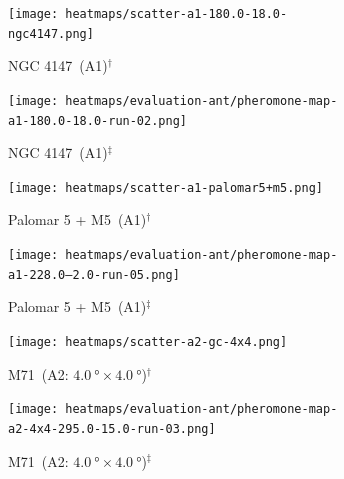 \begin{figure}[H]
    \centering
    \begin{subfigure}[b]{0.241\textwidth}
        \centering
        \captionsetup{justification=centering,format=hang}
        \texttt{[image: heatmaps/scatter-a1-180.0-18.0-ngc4147.png]}
        \caption{\label{fig:scatter-ngc4147} NGC 4147~(A1)$^{\dagger}$ \phantom{abc def ghi}}
    \end{subfigure}
    \begin{subfigure}[b]{0.241\textwidth}
        \centering
        \captionsetup{justification=centering,format=hang}
        \texttt{[image: heatmaps/evaluation-ant/pheromone-map-a1-180.0-18.0-run-02.png]}
        \caption{\label{fig:heat-ngc4147} NGC 4147~(A1)$^{\ddagger}$ \phantom{abc def ghi}}
    \end{subfigure}
    \hspace{0.3em}
    \begin{subfigure}[b]{0.241\textwidth}
        \centering
        \captionsetup{justification=centering,format=hang}
        \texttt{[image: heatmaps/scatter-a1-palomar5+m5.png]}
        \caption{\label{fig:scatter-palomar5} Palomar 5 + M5~(A1)$^{\dagger}$}
    \end{subfigure}
    \begin{subfigure}[b]{0.241\textwidth}
        \centering
        \captionsetup{justification=centering,format=hang}
        \texttt{[image: heatmaps/evaluation-ant/pheromone-map-a1-228.0--2.0-run-05.png]}
        \caption{\label{fig:heat-palomar5} Palomar 5 + M5~(A1)$^{\ddagger}$}
    \end{subfigure}
    \begin{subfigure}[b]{0.241\textwidth}
        \centering
        \captionsetup{justification=centering,format=hang}
        \texttt{[image: heatmaps/scatter-a2-gc-4x4.png]}
        \caption{\label{fig:scatter-M71-dog-4b4}M71~(A2: $\SI{4.0}{\degree}\times\SI{4.0}{\degree}$)$^{\dagger}$}
    \end{subfigure}
    \begin{subfigure}[b]{0.241\textwidth}
        \centering
        \captionsetup{justification=centering,format=hang}
        \texttt{[image: heatmaps/evaluation-ant/pheromone-map-a2-4x4-295.0-15.0-run-03.png]}
        \caption{\label{fig:heat-M71-dog-4b4}M71~(A2: $\SI{4.0}{\degree}\times\SI{4.0}{\degree}$)$^{\ddagger}$}
    \end{subfigure}
    \hspace{0.3em}
    \begin{subfigure}[b]{0.241\textwidth}

\end{subfigure}
\end{figure}
